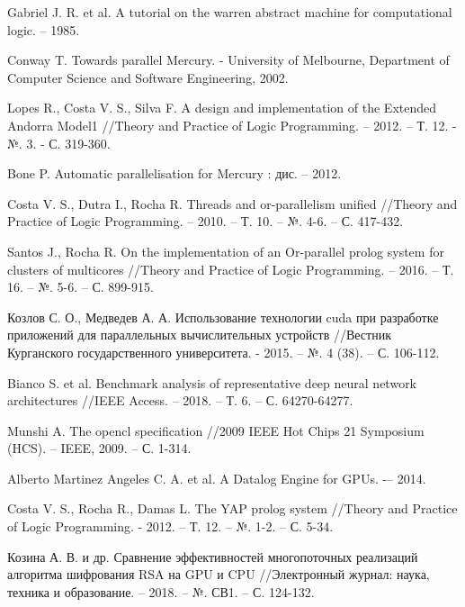 \begin{thebibliography}{5}
	Gabriel J. R. et al. A tutorial on the warren abstract machine for computational logic. – 1985.
	
	Conway T. Towards parallel Mercury. - University of Melbourne, Department of Computer Science and Software Engineering, 2002.
	
	Lopes R., Costa V. S., Silva F. A design and implementation of the Extended Andorra Model1 //Theory and Practice of Logic Programming. – 2012. – Т. 12. - №. 3. - С. 319-360.
	
	Bone P. Automatic parallelisation for Mercury : дис. – 2012.
	
	Costa V. S., Dutra I., Rocha R. Threads and or-parallelism unified //Theory and Practice of Logic Programming. – 2010. – Т. 10. – №. 4-6. – С. 417-432.
	
	Santos J., Rocha R. On the implementation of an Or-parallel prolog system for clusters of multicores //Theory and Practice of Logic Programming. – 2016. – Т. 16. – №. 5-6. – С. 899-915.
	
	Козлов С. О., Медведев А. А. Использование технологии cuda при разработке приложений для параллельных вычислительных устройств //Вестник Курганского государственного университета. - 2015. – №. 4 (38). – С. 106-112.
	
	Bianco S. et al. Benchmark analysis of representative deep neural network architectures //IEEE Access. – 2018. – Т. 6. – С. 64270-64277.
	
	Munshi A. The opencl specification //2009 IEEE Hot Chips 21 Symposium (HCS). – IEEE, 2009. – С. 1-314.
	
	Alberto Martinez Angeles C. A. et al. A Datalog Engine for GPUs. -– 2014.
	
	Costa V. S., Rocha R., Damas L. The YAP prolog system //Theory and Practice of Logic Programming. - 2012. – Т. 12. – №. 1-2. – С. 5-34.
	
	Козина А. В. и др. Сравнение эффективностей многопоточных реализаций алгоритма шифрования RSA на GPU и CPU //Электронный журнал: наука, техника и образование. – 2018. – №. СВ1. – С. 124-132.
	
	
\end{thebibliography}
	